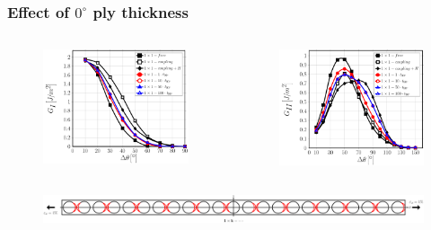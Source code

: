 \documentclass[first,firstsupp,lastsupp,last,hyperref,table]{ETHclass}
\begin{document}
\begin{frame}
\frametitle{\vspace{0.2cm}\small Effect of $0^{\circ}$ ply thickness}
\vspace{-.75cm}
\centering
\begin{columns}[c]
\centering
\begin{column}{0.5\textwidth}
\centering
\begin{figure}
\centering
\includegraphics[width=\columnwidth]{1x1-i-vf60-GI.pdf}
\end{figure}
\end{column}
\begin{column}{0.5\textwidth}
\centering
\begin{figure}
\centering
\includegraphics[width=\columnwidth]{1x1-i-vf60-GII.pdf}
\end{figure}
\end{column}
\end{columns}
\begin{figure}
\centering
\includegraphics[width=\textwidth]{onefiber-sameside-crackshielding1.pdf}
\end{figure}
\end{frame}
\end{document}
